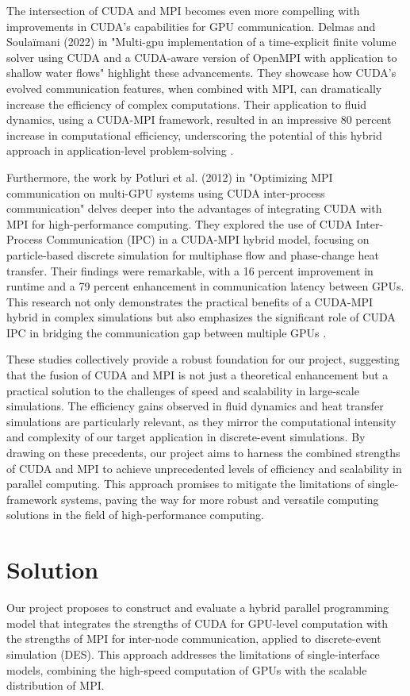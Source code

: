 \documentclass[11pt,twocolumn]{article}
\begin{document}
The intersection of CUDA and MPI becomes even more compelling with improvements in CUDA's capabilities for GPU communication. Delmas and Soulaïmani (2022) in "Multi-gpu implementation of a time-explicit finite volume solver using CUDA and a CUDA-aware version of OpenMPI with application to shallow water flows" highlight these advancements. They showcase how CUDA's evolved communication features, when combined with MPI, can dramatically increase the efficiency of complex computations. Their application to fluid dynamics, using a CUDA-MPI framework, resulted in an impressive 80 percent increase in computational efficiency, underscoring the potential of this hybrid approach in application-level problem-solving \cite{Delmas:WaterFlow}.

Furthermore, the work by Potluri et al. (2012) in "Optimizing MPI communication on multi-GPU systems using CUDA inter-process communication" delves deeper into the advantages of integrating CUDA with MPI for high-performance computing. They explored the use of CUDA Inter-Process Communication (IPC) in a CUDA-MPI hybrid model, focusing on particle-based discrete simulation for multiphase flow and phase-change heat transfer. Their findings were remarkable, with a 16 percent improvement in runtime and a 79 percent enhancement in communication latency between GPUs. This research not only demonstrates the practical benefits of a CUDA-MPI hybrid in complex simulations but also emphasizes the significant role of CUDA IPC in bridging the communication gap between multiple GPUs \cite{Potluri:CUDAIPC}.

These studies collectively provide a robust foundation for our project, suggesting that the fusion of CUDA and MPI is not just a theoretical enhancement but a practical solution to the challenges of speed and scalability in large-scale simulations. The efficiency gains observed in fluid dynamics and heat transfer simulations are particularly relevant, as they mirror the computational intensity and complexity of our target application in discrete-event simulations. By drawing on these precedents, our project aims to harness the combined strengths of CUDA and MPI to achieve unprecedented levels of efficiency and scalability in parallel computing. This approach promises to mitigate the limitations of single-framework systems, paving the way for more robust and versatile computing solutions in the field of high-performance computing.

\section{Solution}\label{soln}
Our project proposes to construct and evaluate a hybrid parallel programming model that integrates the strengths of CUDA for GPU-level computation with the strengths of MPI for inter-node communication, applied to discrete-event simulation (DES). This approach addresses the limitations of single-interface models, combining the high-speed computation of GPUs with the scalable distribution of MPI.
\end{document}
